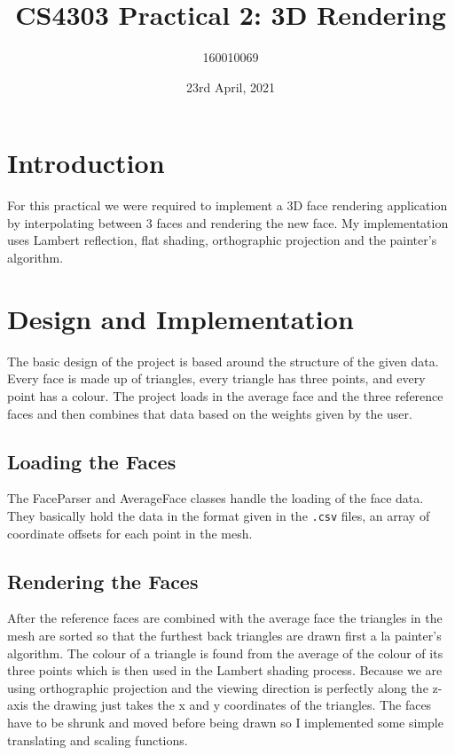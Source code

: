 \documentclass{article}
\begin{document}
\title{CS4303 Practical 2: 3D Rendering}
\author{160010069}
\date{23rd April, 2021}

\begin{titlepage}
    \maketitle
    \tableofcontents
\end{titlepage}

\section{Introduction}
For this practical we were required to implement a 3D 
face rendering application by interpolating between 3 
faces and rendering the new face. My implementation uses 
Lambert reflection, flat shading, orthographic projection 
and the painter's algorithm.  

\section{Design and Implementation}
The basic design of the project is based around the 
structure of the given data. Every face 
is made up of triangles, every triangle 
has three points, and every point has a colour. 
The project loads in the average face and the three 
reference faces and then combines that data 
based on the weights given by the user. 

\subsection{Loading the Faces}
The FaceParser and AverageFace classes handle the loading 
of the face data. They basically hold the data in 
the format given in the \verb+.csv+ files,
an array of coordinate offsets for each point in the 
mesh. 

\subsection{Rendering the Faces}
After the reference faces are combined with the 
average face the triangles in the mesh are sorted 
so that the furthest back triangles are drawn first 
a la painter's algorithm. The colour of a triangle 
is found from the average of the colour of its three points 
which is then used in the Lambert shading process. Because we are 
using orthographic projection and the viewing direction is 
perfectly along the z-axis the drawing just takes the 
x and y coordinates of the triangles. The faces 
have to be shrunk and moved before being drawn 
so I implemented some simple translating and 
scaling functions. 
\end{document}
